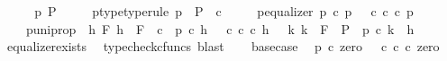 \begin{isabellebody}
%
\isadelimproof
%
\endisadelimproof
%
\isatagproof
{}\isamarkupfalse%
\ {\isacharminus}{\kern0pt}\isanewline
\ \ \isamarkupfalse%
\ p{\isacharprime}{\kern0pt}\ P\ \isanewline
\ \ \ \ p{\isacharprime}{\kern0pt}{\isacharunderscore}{\kern0pt}type{\isacharbrackleft}{\kern0pt}type{\isacharunderscore}{\kern0pt}rule{\isacharbrackright}{\kern0pt}{\isacharcolon}{\kern0pt}\ {\isachardoublequoteopen}p{\isacharprime}{\kern0pt}\ {\isacharcolon}{\kern0pt}\ P\ {\isasymrightarrow}\ {\isasymnat}\isactrlsub c{\isachardoublequoteclose}\ \isanewline
\ \ \ \ p{\isacharprime}{\kern0pt}{\isacharunderscore}{\kern0pt}equalizer{\isacharcolon}{\kern0pt}\ {\isachardoublequoteopen}p\ {\isasymcirc}\isactrlsub c\ p{\isacharprime}{\kern0pt}\ {\isacharequal}{\kern0pt}\ {\isacharparenleft}{\kern0pt}{\isasymt}\ {\isasymcirc}\isactrlsub c\ {\isasymbeta}\isactrlbsub {\isasymnat}\isactrlsub c\isactrlesub {\isacharparenright}{\kern0pt}\ {\isasymcirc}\isactrlsub c\ p{\isacharprime}{\kern0pt}{\isachardoublequoteclose}\ \isanewline
\ \ \ \ p{\isacharprime}{\kern0pt}{\isacharunderscore}{\kern0pt}uni{\isacharunderscore}{\kern0pt}prop{\isacharcolon}{\kern0pt}\ {\isachardoublequoteopen}{\isasymforall}\ h\ F{\isachardot}{\kern0pt}\ {\isacharparenleft}{\kern0pt}h\ {\isacharcolon}{\kern0pt}\ F\ {\isasymrightarrow}\ {\isasymnat}\isactrlsub c\ {\isasymand}\ p\ {\isasymcirc}\isactrlsub c\ h\ {\isacharequal}{\kern0pt}\ {\isacharparenleft}{\kern0pt}{\isasymt}\ {\isasymcirc}\isactrlsub c\ {\isasymbeta}\isactrlbsub {\isasymnat}\isactrlsub c\isactrlesub {\isacharparenright}{\kern0pt}\ {\isasymcirc}\isactrlsub c\ h{\isacharparenright}{\kern0pt}\ {\isasymlongrightarrow}\ {\isacharparenleft}{\kern0pt}{\isasymexists}{\isacharbang}{\kern0pt}\ k{\isachardot}{\kern0pt}\ k\ {\isacharcolon}{\kern0pt}\ F\ {\isasymrightarrow}\ P\ {\isasymand}\ p{\isacharprime}{\kern0pt}\ {\isasymcirc}\isactrlsub c\ k\ {\isacharequal}{\kern0pt}\ h{\isacharparenright}{\kern0pt}{\isachardoublequoteclose}\isanewline
\ \ \ \ \isamarkupfalse%
\ equalizer{\isacharunderscore}{\kern0pt}exists{}\ \isamarkupfalse%
\ {\isacharparenleft}{\kern0pt}typecheck{\isacharunderscore}{\kern0pt}cfuncs{\isacharcomma}{\kern0pt}\ blast{\isacharparenright}{\kern0pt}\isanewline
\isanewline
\ \ \isamarkupfalse%
\ base{\isacharunderscore}{\kern0pt}case\ \isamarkupfalse%
\ {\isachardoublequoteopen}p\ {\isasymcirc}\isactrlsub c\ zero\ {\isacharequal}{\kern0pt}\ {\isacharparenleft}{\kern0pt}{\isasymt}\ {\isasymcirc}\isactrlsub c\ {\isasymbeta}\isactrlbsub {\isasymnat}\isactrlsub c\isactrlesub {\isacharparenright}{\kern0pt}\ {\isasymcirc}\isactrlsub c\ zero{\isachardoublequoteclose}\isanewline

\end{isabellebody}
